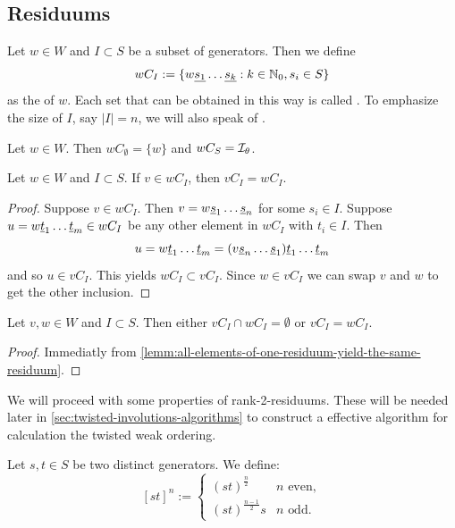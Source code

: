 \subsection{Residuums}
\label{sec:twisted-involutions-residuums}

\begin{defi}
	Let $w \in W$ and $I \subset S$ be a subset of generators. Then we define
	$$ wC_I := \{ w \underline{s_1} \ldots \underline{s_k} : k \in \mathbb{N}_0, s_i \in S \} $$
	as the  of $w$. Each set that can be obtained in this way is called . To emphasize the size of $I$, say $|I| = n$, we will also speak of .
\end{defi}

\begin{exam}
	Let $w \in W$. Then $wC_\emptyset = \{ w \}$ and $wC_S = \mathcal{I}_{\theta}$.
\end{exam}

\begin{lemm}
	Let $w \in W$ and $I \subset S$. If $v \in wC_I$, then $vC_I = wC_I$.

	\begin{proof}
		Suppose $v \in wC_I$. Then $v = w \underline{s}_1 \ldots \underline{s}_n$ for some $s_i \in I$. Suppose $u = w \underline{t}_1 \ldots \underline{t}_m \in wC_I$ be any other element in $wC_I$ with $t_i \in I$. Then
		$$ u = w \underline{t}_1 \ldots \underline{t}_m = (v \underline{s}_n \ldots \underline{s}_1) \underline{t}_1 \ldots \underline{t}_m $$
		and so $u \in vC_I$. This yields $wC_I \subset vC_I$. Since $w \in vC_I$ we can swap $v$ and $w$ to get the other inclusion.
	\end{proof}
\end{lemm}

\begin{coro}
	Let $v, w \in W$ and $I \subset S$. Then either $vC_I \cap wC_I = \emptyset$ or $vC_I = wC_I$.

	\begin{proof}
		Immediatly from \ref{lemm:all-elements-of-one-residuum-yield-the-same-residuum}.
	\end{proof}
\end{coro}

We will proceed with some properties of rank-2-residuums. These will be needed later in \ref{sec:twisted-involutions-algorithms} to construct a effective algorithm for calculation the twisted weak ordering.

\begin{defi}
	Let $s,t \in S$ be two distinct generators. We define:
	$$[st]^n :=
	\begin{cases}
	(st)^{\frac{n}{2}} & n \textrm{ even}, \\
	(st)^{\frac{n-1}{2}}s & n \textrm{ odd}. 
	\end{cases}$$
\end{defi}

